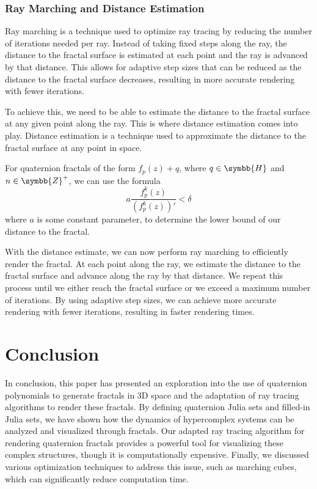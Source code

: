 \documentclass[11pt,hidelinks]{article}
\numberwithin{equation}{section} %
\theoremstyle{bf}
\theoremstyle{indentbf}
\begin{document}
\subsubsection{Ray Marching and Distance Estimation}
\label{marching}
Ray marching is a technique used to optimize ray tracing by reducing the number of iterations needed per ray. Instead of taking fixed steps along the ray, the distance to the fractal surface is estimated at each point and the ray is advanced by that distance. This allows for adaptive step sizes that can be reduced as the distance to the fractal surface decreases, resulting in more accurate rendering with fewer iterations.

To achieve this, we need to be able to estimate the distance to the fractal surface at any given point along the ray. This is where distance estimation comes into play. Distance estimation is a technique used to approximate the distance to the fractal surface at any point in space.

For quaternion fractals of the form \(f_p(z) + q\), where \(q \in \symbb{H}\) and \(n \in \symbb{Z}^+\), we can use the formula
\begin{equation}
    a \frac{f_p^k(z)}{\left(f_p^k\left(z\right)\right)'} < \delta
\end{equation}
where \(a\) is some constant parameter, to determine the lower bound of our distance to the fractal.

With the distance estimate, we can now perform ray marching to efficiently render the fractal. At each point along the ray, we estimate the distance to the fractal surface and advance along the ray by that distance. We repeat this process until we either reach the fractal surface or we exceed a maximum number of iterations. By using adaptive step sizes, we can achieve more accurate rendering with fewer iterations, resulting in faster rendering times.

\section{Conclusion}
\label{sec:orgb29f40d}

In conclusion, this paper has presented an exploration into the use of quaternion polynomials to generate fractals in 3D space and the adaptation of ray tracing algorithms to render these fractals. By defining quaternion Julia sets and filled-in Julia sets, we have shown how the dynamics of hypercomplex systems can be analyzed and visualized through fractals. Our adapted ray tracing algorithm for rendering quaternion fractals provides a powerful tool for visualizing these complex structures, though it is computationally expensive. Finally, we discussed various optimization techniques to address this issue, such as marching cubes, which can significantly reduce computation time.

\clearpage %
\nocite{*} %


\end{document}
